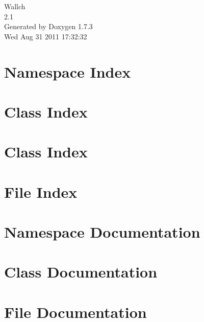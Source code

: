 \documentclass[a4paper]{book}
\begin{document}
\hypersetup{pageanchor=false}
\begin{titlepage}
\vspace*{7cm}
\begin{center}
{\Large Wallch \\[1ex]\large 2.1 }\\
\vspace*{1cm}
{\large Generated by Doxygen 1.7.3}\\
\vspace*{0.5cm}
{\small Wed Aug 31 2011 17:32:32}\\
\end{center}
\end{titlepage}
\clearemptydoublepage
{}
\tableofcontents
\clearemptydoublepage
{}
\hypersetup{pageanchor=true}
\chapter{Namespace Index}

\chapter{Class Index}

\chapter{Class Index}

\chapter{File Index}

\chapter{Namespace Documentation}

\chapter{Class Documentation}

















\chapter{File Documentation}






























\printindex
\end{document}
